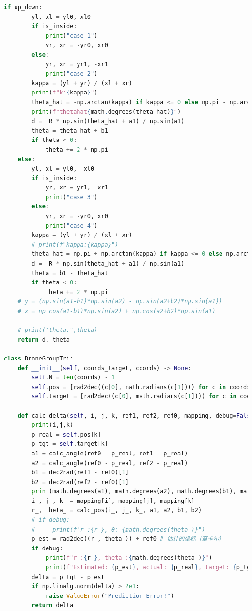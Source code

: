\documentclass[withoutpreface,bwprint]{cumcmthesis} %
\begin{document}
\begin{appendices}
\begin{lstlisting}[language=python]
    if up_down:
        yl, xl = yl0, xl0
        if is_inside:
            print("case 1")
            yr, xr = -yr0, xr0
        else:
            yr, xr = yr1, -xr1
            print("case 2")
        kappa = (yl + yr) / (xl + xr)
        print(f"k:{kappa}")
        theta_hat = -np.arctan(kappa) if kappa <= 0 else np.pi - np.arctan(kappa)
        print(f"thetahat{math.degrees(theta_hat)}")
        d =  R * np.sin(theta_hat + a1) / np.sin(a1)
        theta = theta_hat + b1
        if theta < 0:
            theta += 2 * np.pi
    else:
        yl, xl = yl0, -xl0
        if is_inside:
            yr, xr = yr1, -xr1
            print("case 3")
        else:
            yr, xr = -yr0, xr0
            print("case 4")
        kappa = (yl + yr) / (xl + xr)
        # print(f"kappa:{kappa}")
        theta_hat = np.pi + np.arctan(kappa) if kappa <= 0 else np.arctan(kappa)
        d =  R * np.sin(theta_hat + a1) / np.sin(a1)
        theta = b1 - theta_hat
        if theta < 0:
            theta += 2 * np.pi
    # y = (np.sin(a1-b1)*np.sin(a2) - np.sin(a2+b2)*np.sin(a1))
    # x = np.cos(a1-b1)*np.sin(a2) + np.cos(a2+b2)*np.sin(a1)
    
    # print("theta:",theta)
    return d, theta
    
class DroneGroupTri:
    def __init__(self, coords_target, coords) -> None:
        self.N = len(coords) - 1
        self.pos = [rad2dec((c[0], math.radians(c[1]))) for c in coords] # 极坐标
        self.target = [rad2dec((c[0], math.radians(c[1]))) for c in coords_target]
    
    def calc_delta(self, i, j, k, ref1, ref2, ref0, mapping, debug=False):
        print(i,j,k)
        p_real = self.pos[k]
        p_tgt = self.target[k]
        a1 = calc_angle(ref0 - p_real, ref1 - p_real)
        a2 = calc_angle(ref0 - p_real, ref2 - p_real)
        b1 = dec2rad(ref1 - ref0)[1]
        b2 = dec2rad(ref2 - ref0)[1]
        print(math.degrees(a1), math.degrees(a2), math.degrees(b1), math.degrees(b2),sep=',')
        i_, j_, k_ = mapping[i], mapping[j], mapping[k]
        r_, theta_ = calc_pos(i_, j_, k_, a1, a2, b1, b2)
        # if debug:
        #     print(f"r_:{r_}, θ: {math.degrees(theta_)}")
        p_est = rad2dec((r_, theta_)) + ref0 # 估计的坐标（笛卡尔）
        if debug:
            print(f"r_:{r_}, theta_:{math.degrees(theta_)}")
            print(f"Estimated: {p_est}, actual: {p_real}, target: {p_tgt}")
        delta = p_tgt - p_est
        if np.linalg.norm(delta) > 2e1:
            raise ValueError("Prediction Error!")
        return delta
    

\end{lstlisting}
\end{appendices}
\end{document}
